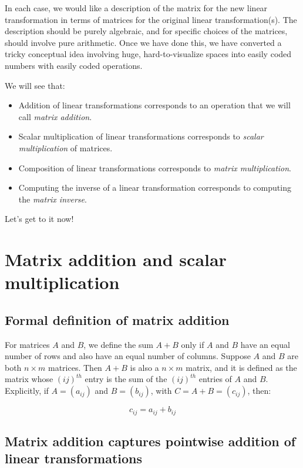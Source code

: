 \documentclass[10pt]{amsart}
\begin{document}
In each case, we would like a description of the matrix for the new
linear transformation in terms of matrices for the original linear
transformation(s). The description should be purely algebraic, and for
specific choices of the matrices, should involve pure arithmetic. Once
we have done this, we have converted a tricky conceptual idea
involving huge, hard-to-visualize spaces into easily coded numbers
with easily coded operations.

We will see that:

\begin{itemize}
\item Addition of linear transformations corresponds to an operation
  that we will call {\em matrix addition}.
\item Scalar multiplication of linear transformations corresponds to
  {\em scalar multiplication} of matrices.
\item Composition of linear transformations corresponds to {\em matrix
  multiplication}.
\item Computing the inverse of a linear transformation corresponds to
  computing the {\em matrix inverse}.
\end{itemize}

Let's get to it now!

\section{Matrix addition and scalar multiplication}

\subsection{Formal definition of matrix addition}

For matrices $A$ and $B$, we define the sum $A + B$ only if $A$ and
$B$ have an equal number of rows and also have an equal number of
columns. Suppose $A$ and $B$ are both $n \times m$ matrices. Then $A +
B$ is also a $n \times m$ matrix, and it is defined as the matrix
whose $(ij)^{th}$ entry is the sum of the $(ij)^{th}$ entries of $A$
and $B$. Explicitly, if $A = (a_{ij})$ and $B = (b_{ij})$, with $C = A
+ B = (c_{ij})$, then:

$$c_{ij} = a_{ij} + b_{ij}$$

\subsection{Matrix addition captures pointwise addition of linear transformations}
\end{document}
